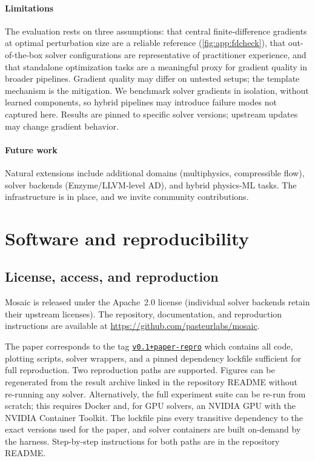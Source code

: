 \documentclass[11pt,a4paper]{article}
\begin{document}
\paragraph{Limitations}
The evaluation rests on three assumptions: that central
finite-difference gradients at optimal perturbation size are a reliable
reference (\cref{fig:app:fdcheck}), that out-of-the-box solver configurations
are representative of practitioner experience, and that standalone
optimization tasks are a meaningful proxy for gradient quality in broader
pipelines. Gradient quality may differ on untested setups; the
template mechanism is the mitigation. We benchmark solver gradients in
isolation, without learned components, so hybrid pipelines may introduce
failure modes not captured here. Results are pinned to specific solver
versions; upstream updates may change gradient behavior.

\paragraph{Future work}
Natural extensions include additional domains (multiphysics, compressible
flow), solver backends (Enzyme/LLVM-level AD), and hybrid physics-ML tasks.
The infrastructure is in place, and we invite community contributions.


\PLrefheading


\clearpage

\appendix

\section{Software and reproducibility}
\label{app:software}

\subsection{License, access, and reproduction}

Mosaic is released under the Apache~2.0 license (individual solver backends
retain their upstream licenses). The repository, documentation, and
reproduction instructions are available at
\url{https://github.com/pasteurlabs/mosaic}.

The paper corresponds to the tag
\href{https://github.com/pasteurlabs/mosaic/tree/v0.1%2Bpaper-repro}{\texttt{v0.1+paper-repro}}
which contains all code, plotting scripts,
solver wrappers, and a pinned dependency lockfile sufficient for full
reproduction. Two reproduction paths are supported. Figures can be
regenerated from the result archive linked in the repository README without
re-running any solver. Alternatively, the full experiment suite can be
re-run from scratch; this requires Docker and, for GPU solvers, an NVIDIA
GPU with the NVIDIA Container Toolkit. The lockfile pins every transitive
dependency to the exact versions used for the paper, and solver containers
are built on-demand by the harness. Step-by-step instructions for both
paths are in the repository README.
\end{document}
